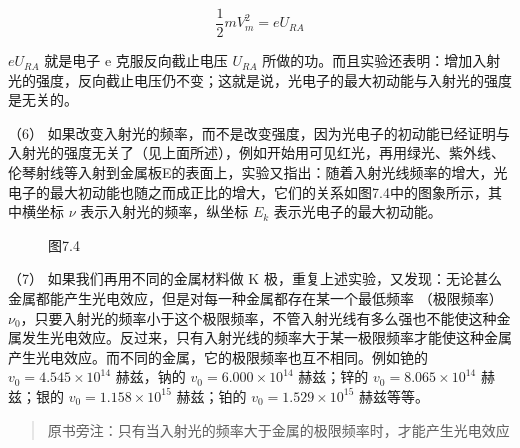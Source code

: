 \[
\frac {1}{2} m V _ {m} ^ {2} = e U _ {R A}
\]

\(eU_{RA}\) 就是电子 e 克服反向截止电压 \(U_{RA}\)
所做的功。而且实验还表明：增加入射光的强度，反向截止电压仍不变；这就是说，光电子的最大初动能与入射光的强度是无关的。

（6）
如果改变入射光的频率，而不是改变强度，因为光电子的初动能已经证明与入射光的强度无关了（见上面所述），例如开始用可见红光，再用绿光、紫外线、伦琴射线等入射到金属板E的表面上，实验又指出：随着入射光线频率的增大，光电子的最大初动能也随之而成正比的增大，它们的关系如图7.4中的图象所示，其中横坐标
\(\nu\) 表示入射光的频率，纵坐标 \(E_{k}\) 表示光电子的最大初动能。

\begin{figure}
\centering
\caption{图7.4}
\end{figure}

（7） 如果我们再用不同的金属材料做 K
极，重复上述实验，又发现：无论甚么金属都能产生光电效应，但是对每一种金属都存在某一个最低频率
（极限频率）
\(\nu_0\)，只要入射光的频率小于这个极限频率，不管入射光线有多么强也不能使这种金属发生光电效应。反过来，只有入射光线的频率大于某一极限频率才能使这种金属产生光电效应。而不同的金属，它的极限频率也互不相同。例如铯的
\(v_{0}=4.545\times10^{14}\) 赫兹，钠的 \(v_{0}=6.000\times10^{14}\)
赫兹；锌的 \(v_{0}=8.065\times10^{14}\) 赫兹；银的
\(v_{0}=1.158\times10^{15}\) 赫兹；铂的 \(v_{0}=1.529\times10^{15}\)
赫兹等等。

\begin{quote}
原书旁注：只有当入射光的频率大于金属的极限频率时，才能产生光电效应
\end{quote}

